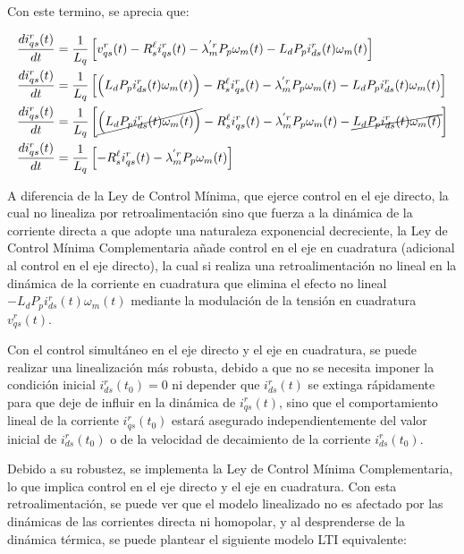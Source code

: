 \documentclass[blue,fullpaper]{ludusofficial}  %
\begin{document}
\begin{enumerate}
    Con este termino, se aprecia que:

    \begin{align*}
        \frac{di_{qs}^{r}(t)}{dt}  & = \frac{1}{L_{q} } \left[ v_{qs}^{r}(t) - R_{s}^{\ell} i_{qs}^{r}(t) - \lambda_{m}^{'r} P_{p}  \omega_{m}(t) -  L_{d} P_{p} i_{ds}^{r}(t) \omega_{m}(t)  \right]
        \\
        \frac{di_{qs}^{r}(t)}{dt}  & = \frac{1}{L_{q} } \left[ \Big( L_{d} P_{p} i_{ds}^{r}(t) \omega_{m}(t) \Big) - R_{s}^{\ell} i_{qs}^{r}(t) - \lambda_{m}^{'r} P_{p}  \omega_{m}(t) -  L_{d} P_{p} i_{ds}^{r}(t) \omega_{m}(t)  \right]
        \\
        \frac{di_{qs}^{r}(t)}{dt}  & = \frac{1}{L_{q} } \left[ \cancel{ \Big( L_{d} P_{p} i_{ds}^{r}(t) \omega_{m}(t) \Big) } - R_{s}^{\ell} i_{qs}^{r}(t) - \lambda_{m}^{'r} P_{p}  \omega_{m}(t) - \cancel{  L_{d} P_{p} i_{ds}^{r}(t) \omega_{m}(t) }  \right]\\
        \frac{di_{qs}^{r}(t)}{dt}  & = \frac{1}{L_{q} } \left[ - R_{s}^{\ell} i_{qs}^{r}(t) - \lambda_{m}^{'r} P_{p}  \omega_{m}(t)  \right]
    \end{align*}

    A diferencia de la Ley de Control Mínima, que ejerce control en el eje directo, la cual no linealiza por retroalimentación sino que fuerza a la dinámica de la corriente directa a que adopte una naturaleza exponencial decreciente, la Ley de Control Mínima Complementaria añade control en el eje en cuadratura (adicional al control en el eje directo), la cual si realiza una retroalimentación no lineal en la dinámica de la corriente en cuadratura que elimina el efecto no lineal $-L_{d} P_{p} i_{ds}^{r}(t) \omega_{m}(t) $ mediante la modulación de la tensión en cuadratura $ v_{qs}^{r}(t)$.

    Con el control simultáneo en el eje directo y el eje en cuadratura, se puede realizar una linealización más robusta, debido a que no se necesita imponer la condición inicial $i_{ds}^{r}(t_0) = 0$ ni depender que $i_{ds}^{r}(t)$ se extinga rápidamente para que deje de influir en la dinámica de $i_{qs}^{r}(t)$, sino que el comportamiento lineal de la corriente $i_{qs}^{r}(t_0)$ estará asegurado independientemente del valor inicial de $i_{ds}^{r}(t_0)$ o de la velocidad de decaimiento de la corriente $i_{ds}^{r}(t_0)$.
\end{enumerate}

Debido a su robustez, se implementa la Ley de Control Mínima Complementaria, lo que implica control en el eje directo y el eje en cuadratura. Con esta retroalimentación, se puede ver que el modelo linealizado no es afectado por las dinámicas de las corrientes directa ni homopolar, y al desprenderse de la dinámica térmica, se puede plantear el siguiente modelo LTI equivalente:
\end{document}
